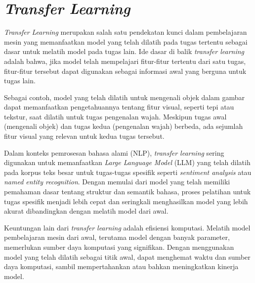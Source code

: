 \section{\textit{Transfer Learning}}

\textit{Transfer Learning} merupakan salah satu pendekatan kunci dalam pembelajaran mesin yang memanfaatkan model yang telah dilatih pada tugas tertentu sebagai dasar untuk melatih model pada tugas lain. Ide dasar di balik \textit{transfer learning} adalah bahwa, jika model telah mempelajari fitur-fitur tertentu dari satu tugas, fitur-fitur tersebut dapat digunakan sebagai informasi awal yang berguna untuk tugas lain.

Sebagai contoh, model yang telah dilatih untuk mengenali objek dalam gambar dapat memanfaatkan pengetahuannya tentang fitur visual, seperti tepi atau tekstur, saat dilatih untuk tugas pengenalan wajah. Meskipun tugas awal (mengenali objek) dan tugas kedua (pengenalan wajah) berbeda, ada sejumlah fitur visual yang relevan untuk kedua tugas tersebut.

Dalam konteks pemrosesan bahasa alami (NLP), \textit{transfer learning} sering digunakan untuk memanfaatkan \textit{Large Language Model} (LLM) yang telah dilatih pada korpus teks besar untuk tugas-tugas spesifik seperti \textit{sentiment analysis} atau \textit{named entity recognition}. Dengan memulai dari model yang telah memiliki pemahaman dasar tentang struktur dan semantik bahasa, proses pelatihan untuk tugas spesifik menjadi lebih cepat dan seringkali menghasilkan model yang lebih akurat dibandingkan dengan melatih model dari awal.

Keuntungan lain dari \textit{transfer learning} adalah efisiensi komputasi. Melatih model pembelajaran mesin dari awal, terutama model dengan banyak parameter, memerlukan sumber daya komputasi yang signifikan. Dengan menggunakan model yang telah dilatih sebagai titik awal, dapat menghemat waktu dan sumber daya komputasi, sambil mempertahankan atau bahkan meningkatkan kinerja model.

